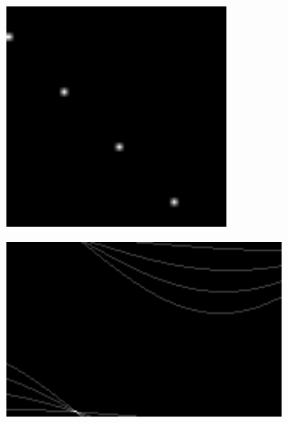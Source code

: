 \documentclass[12pt
,headinclude
,headsepline
,bibtotocnumbered
]{scrartcl}
\begin{document}
\begin{figure}[H]
    \centering
    \begin{subfigure}{0.45\textwidth}
        \includegraphics[width=0.8\textwidth]{plots/test1.png}
    \end{subfigure}
    \hfill
    \begin{subfigure}{0.45\textwidth}
        \includegraphics[width=1.25\textwidth]{plots/test1_hough.png}
    \end{subfigure}
    \\
    \begin{subfigure}{0.45\textwidth}

\end{subfigure}
\end{figure}
\end{document}
